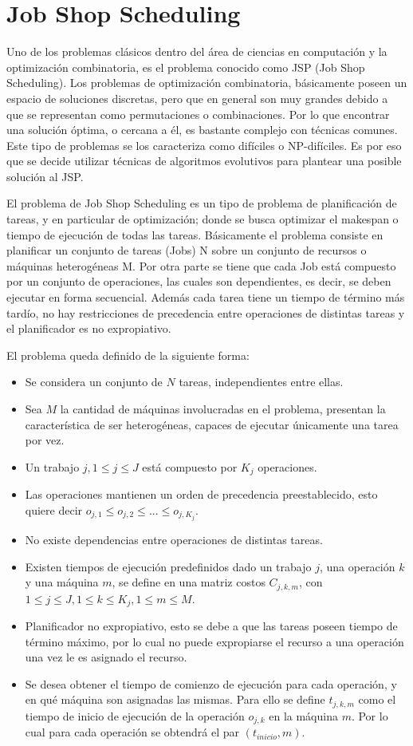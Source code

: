 \documentclass[journal]{IEEEtran}
\begin{document}
\section{Job Shop Scheduling}
Uno de los problemas clásicos dentro del área de ciencias en computación y la optimización combinatoria, es el problema conocido como JSP (Job Shop Scheduling). 	Los problemas de optimización combinatoria, básicamente poseen un espacio de soluciones discretas, pero que en general son muy grandes debido a que se representan como permutaciones o combinaciones. Por lo que encontrar una solución óptima, o cercana a él, es bastante complejo con técnicas comunes. 
	Este tipo de problemas se los caracteriza como difíciles o NP-difíciles. Es por eso que se decide utilizar técnicas de algoritmos evolutivos para plantear una posible solución al JSP.

	El problema de Job Shop Scheduling  es un tipo de problema de planificación de tareas, y en particular de optimización; donde se busca optimizar el makespan o tiempo de ejecución de todas las tareas. 
	Básicamente el problema consiste en planificar un conjunto de tareas (Jobs) N sobre un conjunto de recursos o máquinas heterogéneas M. 
	Por otra parte se tiene que cada Job está compuesto por un conjunto de operaciones, las cuales son dependientes, es decir, se deben ejecutar en forma secuencial. 
	Además cada tarea tiene un tiempo de término más tardío, no hay restricciones de precedencia entre operaciones de distintas tareas y el planificador es no expropiativo.
	
	El problema queda definido de la siguiente forma:
\begin{itemize}
  \item Se considera un conjunto de $N$ tareas, independientes entre ellas.
  \item Sea $M$ la cantidad de máquinas involucradas en el problema, presentan la característica de ser heterogéneas, capaces de ejecutar únicamente una tarea por vez.
  \item Un trabajo $j, 1\leq j \leq J$  está compuesto por $K_{j}$ operaciones.
  \item Las operaciones mantienen un orden de precedencia preestablecido, esto quiere decir $o_{j,1}\le o_{j,2} \le ... \le o_{j,K_{j}}$.
  \item No existe dependencias entre operaciones de distintas tareas.
  \item Existen tiempos de ejecución predefinidos dado un trabajo $j$, una operación $k$ y una máquina $m$, se define en una matriz costos $C_{j,k,m}$, con $1\leq j \leq J, 1\leq k \leq K_{j}, 1\leq m \leq M$.
  \item Planificador no expropiativo, esto se debe a que las tareas poseen tiempo de término máximo, por lo cual no puede expropiarse el recurso a una operación una vez le es asignado el recurso.
  \item Se desea obtener el tiempo de comienzo de ejecución para cada operación, y en qué máquina son asignadas las mismas. Para ello se define $t_{j,k,m}$ como el tiempo de inicio de ejecución de la operación $o_{j,k}$ en la máquina $m$. Por lo cual para cada operación se obtendrá el par $(t_{inicio}, m)$.
\end{itemize}
\end{document}
